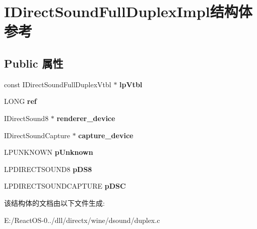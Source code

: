 \hypertarget{struct_i_direct_sound_full_duplex_impl}{}\section{I\+Direct\+Sound\+Full\+Duplex\+Impl结构体 参考}
\label{struct_i_direct_sound_full_duplex_impl}
\subsection*{Public 属性}
\begin{DoxyCompactItemize}
\item 
\mbox{\label{struct_i_direct_sound_full_duplex_impl_acd61d5bc119f6d9bf1fccb3eab4f1afc}} 
const I\+Direct\+Sound\+Full\+Duplex\+Vtbl $\ast$ {\bfseries lp\+Vtbl}
\item 
\mbox{\label{struct_i_direct_sound_full_duplex_impl_a9e2c55a63c6f2e24e047a407bf6fcc2c}} 
L\+O\+NG {\bfseries ref}
\item 
\mbox{\label{struct_i_direct_sound_full_duplex_impl_a92d706f3d193bdd7a5366285615fbc39}} 
I\+Direct\+Sound8 $\ast$ {\bfseries renderer\+\_\+device}
\item 
\mbox{\label{struct_i_direct_sound_full_duplex_impl_a4bb64d772e51228b8b9225507a6b0c67}} 
I\+Direct\+Sound\+Capture $\ast$ {\bfseries capture\+\_\+device}
\item 
\mbox{\label{struct_i_direct_sound_full_duplex_impl_a70474532ca3d028c6012ea4d5582b86a}} 
L\+P\+U\+N\+K\+N\+O\+WN {\bfseries p\+Unknown}
\item 
\mbox{\label{struct_i_direct_sound_full_duplex_impl_ac23bae57367061edc943aecc783e5945}} 
L\+P\+D\+I\+R\+E\+C\+T\+S\+O\+U\+N\+D8 {\bfseries p\+D\+S8}
\item 
\mbox{\label{struct_i_direct_sound_full_duplex_impl_a6344ae740ef0fd85342c1cfcf9d5f710}} 
L\+P\+D\+I\+R\+E\+C\+T\+S\+O\+U\+N\+D\+C\+A\+P\+T\+U\+RE {\bfseries p\+D\+SC}
\end{DoxyCompactItemize}


该结构体的文档由以下文件生成\+:\begin{DoxyCompactItemize}
\item 
E\+:/\+React\+O\+S-\/0../dll/directx/wine/dsound/duplex.\+c\end{DoxyCompactItemize}
